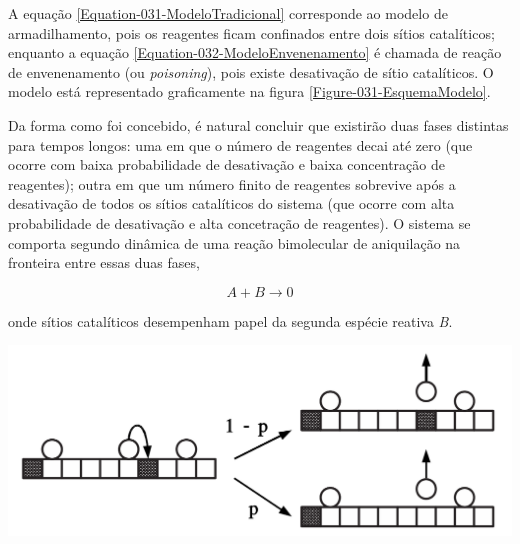 A equação \ref{Equation-031-ModeloTradicional} corresponde ao modelo de armadilhamento, pois
os reagentes ficam confinados entre dois sítios catalíticos; enquanto a equação
\ref{Equation-032-ModeloEnvenenamento} é chamada de reação de envenenamento (ou
\textit{poisoning}), pois existe desativação de sítio catalíticos. O modelo está
representado graficamente na figura \ref{Figure-031-EsquemaModelo}.

Da forma como foi concebido, é natural concluir que existirão duas fases
distintas para tempos longos: uma em que o número de reagentes decai até zero
(que ocorre com baixa probabilidade de desativação e baixa concentração de
reagentes); outra em que um número finito de reagentes sobrevive após a
desativação de todos os sítios catalíticos do sistema (que ocorre com alta
probabilidade de desativação e alta concetração de reagentes). O sistema se
comporta segundo dinâmica de uma reação bimolecular de aniquilação na fronteira
entre essas duas fases,

{
\setlength{\belowdisplayskip}{0pt} \setlength{\belowdisplayshortskip}{0pt}
\setlength{\abovedisplayskip}{0pt} \setlength{\abovedisplayshortskip}{0pt}

\begin{equation}
  A + B \longrightarrow 0
  \label{modelo-bimolecular}
\end{equation}
}

\noindent onde sítios catalíticos desempenham papel da segunda espécie reativa
\textit{B}.

{
  \centering
  \captionsetup{type=figure}
	\includegraphics[width=\columnwidth]{./figures/031-EsquemaModelo.png}
	\label{Figure-031-EsquemaModelo}
}
